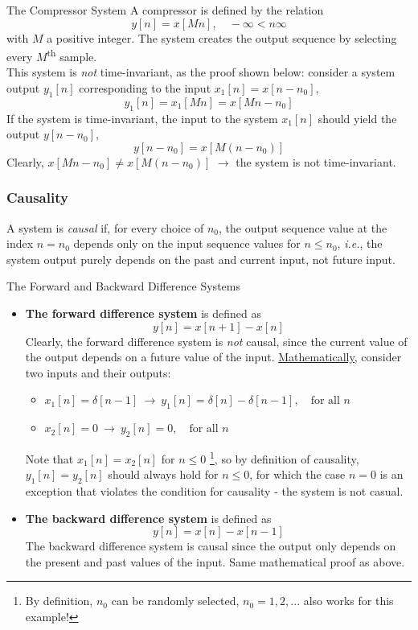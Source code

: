 \begin{ex}{The Compressor System}
A compressor is defined by the relation
\[
    y[n] = x[Mn], \quad -\infty < n \infty
\]
with $M$ a positive integer. The system creates the output sequence by selecting every $M$\textsuperscript{th} sample. \\

This system is \textit{not} time-invariant, as the proof shown below: consider a system output $y_1[n]$ corresponding to the input $x_1[n]=x[n-n_0]$, 
\[
    y_1[n] = x_1[Mn] = x[Mn-n_0]
\]
If the system is time-invariant, the input to the system $x_1[n]$ should yield the output $y[n-n_0]$,
\[
    y[n-n_0] = x[M(n-n_0)]
\]
Clearly, $x[Mn-n_0] \neq x[M(n-n_0)]$ $\to$ the system is not time-invariant. 
\end{ex}
\subsubsection{Causality}
A system is \textit{causal} if, for every choice of $n_0$, the output sequence value at the index $n=n_0$ depends only on the input sequence values for $n\leq n_0$, \textit{i.e.}, the system output purely depends on the past and current input, not future input. 

\begin{ex}{The Forward and Backward Difference Systems}
\begin{itemize}
    \item \textbf{The forward difference system} is defined as
    \[
        y[n] = x[n+1] - x[n]
    \]
    Clearly, the forward difference system is \textit{not} causal, since the current value of the output depends on a future value of the input. \underline{Mathematically,} consider two inputs and their outputs:
    \begin{itemize}
        \item $x_1[n]=\delta[n-1] \ \longrightarrow \ y_1[n]=\delta[n]-\delta[n-1], \quad \text{for all $n$}$

        \item $x_2[n]=0 \ \longrightarrow \ y_2[n]=0, \quad \text{for all $n$}$
    \end{itemize}

    Note that $x_1[n] = x_2[n]$ for $n \leq 0$ \footnote{ By definition, $n_0$ can be randomly selected, $n_0=1, 2,...$ also works for this example!}, so by definition of causality, $y_1[n] = y_2[n]$ should always hold for $n \leq 0$, for which the case $n=0$ is an exception that violates the condition for causality - the system is not casual. %

    \item \textbf{The backward difference system} is defined as
    \[
        y[n] = x[n] - x[n-1]
    \]
    The backward difference system is causal since the output only depends on the present and past values of the input. Same mathematical proof as above.
\end{itemize}
\end{ex}
